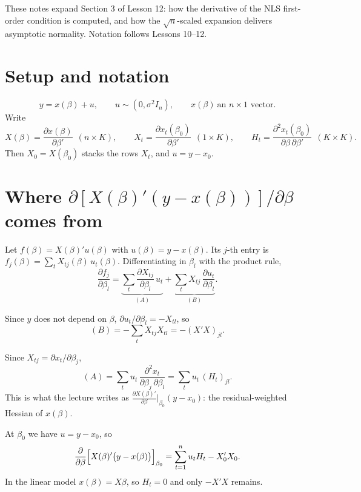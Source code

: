 \documentclass[11pt]{article}
\begin{document}

 These notes expand Section 3 of Lesson 12: how the derivative of the
NLS first-order condition is computed, and how the $\sqrt{n}$-scaled expansion
delivers asymptotic normality. Notation follows Lessons 10--12.

\section{Setup and notation}

\[ y = x(\beta) + u, \qquad u \sim (0,\sigma^{2}I_{n}),
   \qquad x(\beta) \ \text{an } n\times 1 \text{ vector}. \]
Write
\[ X(\beta) = \frac{\partial x(\beta)}{\partial\beta'} \ \ (n\times K), \qquad
   X_{t} = \frac{\partial x_{t}(\beta_{0})}{\partial\beta'} \ \ (1\times K), \qquad
   H_{t} = \frac{\partial^{2}x_{t}(\beta_{0})}{\partial\beta\,\partial\beta'}
           \ \ (K\times K). \]
Then $X_{0}=X(\beta_{0})$ stacks the rows $X_{t}$, and $u=y-x_{0}$.

\section{Where $\partial[X(\beta)'(y-x(\beta))]/\partial\beta$ comes from}

Let $f(\beta)=X(\beta)'u(\beta)$ with $u(\beta)=y-x(\beta)$. Its $j$-th entry is
$f_{j}(\beta)=\sum_{t}X_{tj}(\beta)\,u_{t}(\beta)$. Differentiating in
$\beta_{l}$ with the product rule,
\[ \frac{\partial f_{j}}{\partial\beta_{l}}
   = \underbrace{\sum_{t}\frac{\partial X_{tj}}{\partial\beta_{l}}\,u_{t}}_{(A)}
   + \underbrace{\sum_{t}X_{tj}\,\frac{\partial u_{t}}{\partial\beta_{l}}}_{(B)}. \]

Since $y$ does not depend on $\beta$, $\partial u_{t}/\partial\beta_{l}=-X_{tl}$,
so
\[ (B) = -\sum_{t}X_{tj}X_{tl} = -(X'X)_{jl}. \]

Since $X_{tj}=\partial x_{t}/\partial\beta_{j}$,
\[ (A) = \sum_{t}u_{t}\,\frac{\partial^{2}x_{t}}{\partial\beta_{j}\,\partial\beta_{l}}
       = \sum_{t}u_{t}\,(H_{t})_{jl}. \]
This is what the lecture writes as
$\frac{\partial X(\beta)'}{\partial\beta}\big|_{\beta_{0}}(y-x_{0})$: the
residual-weighted Hessian of $x(\beta)$.

At $\beta_{0}$ we have $u=y-x_{0}$, so
\[ \frac{\partial}{\partial\beta}
   \Bigl[X(\beta)'\bigl(y-x(\beta)\bigr)\Bigr]_{\beta_{0}}
   = \sum_{t=1}^{n}u_{t}H_{t} - X_{0}'X_{0}. \]
In the linear model $x(\beta)=X\beta$, so $H_{t}=0$ and only $-X'X$ remains.
\end{document}
